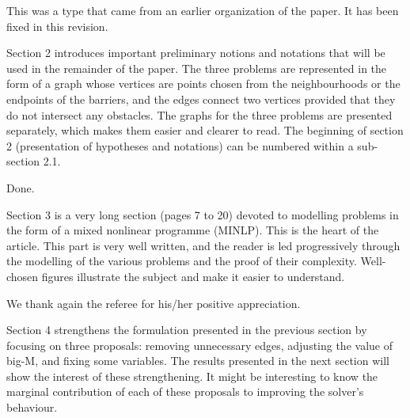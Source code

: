 \documentclass{article}
\newenvironment{reviewer}{\setcounter{pointcounter}{1}}{}
\newcommand{\point}{\text{{\selectfont \thepointcounter} \stepcounter{pointcounter}}}
\begin{document}
\begin{reviewer}
		\begin{tcolorbox}[breakable,enhanced,coltitle=black,colback=green!5!white,colframe=green!75!black,title=\textbf{Answer R2.\point},borderline={1pt}{0pt}{black},boxrule=0pt]
		This was a type that came from an earlier organization of the paper. It has been fixed in this revision.

		\end{tcolorbox}
		
		\begin{itshape}
			Section 2 introduces important preliminary notions and notations that will be used in the remainder of the paper. The three problems are represented in the form of a graph whose vertices are points chosen from the neighbourhoods or the endpoints of the barriers, and the edges connect two vertices provided that they do not intersect any obstacles. The graphs for the three problems are presented separately, which makes them easier and clearer to read. The beginning of section 2 (presentation of hypotheses and notations) can be numbered within a sub-section 2.1.
		\end{itshape}
		
		\begin{tcolorbox}[breakable,enhanced,coltitle=black,colback=green!5!white,colframe=green!75!black,title=\textbf{Answer R2.\point},borderline={1pt}{0pt}{black},boxrule=0pt]
		Done.

		\end{tcolorbox}
		
		\begin{itshape}
			Section 3 is a very long section (pages 7 to 20) devoted to modelling problems in the form of a mixed nonlinear programme (MINLP). This is the heart of the article. This part is very well written, and the reader is led progressively through the modelling of the various problems and the proof of their complexity. Well-chosen figures illustrate the subject and make it easier to understand.
		\end{itshape}


		\begin{tcolorbox}[breakable,enhanced,coltitle=black,colback=green!5!white,colframe=green!75!black,title=\textbf{Answer R2.\point},borderline={1pt}{0pt}{black},boxrule=0pt]
			We thank again the referee for his/her positive  appreciation.
		\end{tcolorbox}
		
		\begin{itshape}
			Section 4 strengthens the formulation presented in the previous section by focusing on three proposals: removing unnecessary edges, adjusting the value of big-M, and fixing some variables. The results presented in the next section will show the interest of these strengthening. It might be interesting to know the marginal contribution of each of these proposals to improving the solver's behaviour.
		\end{itshape}
		

\end{reviewer}
\end{document}
